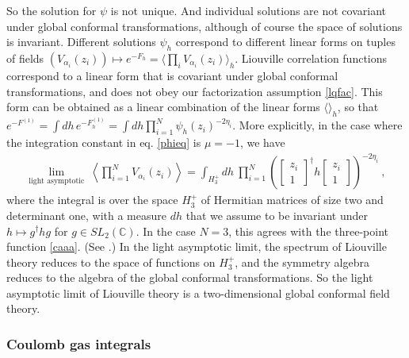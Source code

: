 \documentclass[12pt, a4paper, notitlepage, twoside]{report}
\numberwithin{equation}{section}
\theoremstyle{break}
\begin{document}
So the solution for $\psi$ is not unique. And individual solutions are not covariant under global conformal transformations, although of course the space of solutions is invariant.
Different solutions $\psi_h$ correspond to different linear forms on tuples of fields $(V_{\alpha_i}(z_i)) \mapsto e^{-F_h} = \langle \prod_i V_{\alpha_i}(z_i)\rangle_h$. 
Liouville correlation functions correspond to a linear form that is covariant under global conformal transformations, and does not  obey our factorization assumption \eqref{lqfac}. 
This form can be obtained as a linear combination of the linear forms $\langle \rangle_h$, so that $e^{-F^{(1)}} = \int dh\, e^{-F^{(1)}_h} = \int dh \prod_{i=1}^N \psi_h(z_i)^{-2\eta_i}$. 
More explicitly, in the case where the integration constant in eq. \eqref{phieq} is $\mu=-1$, we have
\begin{align}
\underset{\text{light asymptotic}}{\lim}\ \left\langle\prod_{i=1}^N V_{\alpha_i}(z_i)\right\rangle= \int_{H^+_3} dh\ \prod_{i=1}^N \left( \left[\begin{smallmatrix} z_i \\ 1 \end{smallmatrix}\right]^\dagger h \left[\begin{smallmatrix} z_i \\ 1 \end{smallmatrix}\right] \right)^{-2\eta_i}\ ,
\label{zih}
\end{align}
where the integral is over the space \textbf{\boldmath $H_3^+$} of Hermitian matrices of size two and determinant one, with a measure $dh$ that we assume to be invariant under $h\mapsto g^\dagger hg$ for $g\in SL_2({\mathbb{C}})$.
In the case $N=3$, this agrees with the three-point function \eqref{caaa}. (See \cite{zz95}.) In the light asymptotic limit, the spectrum of Liouville theory reduces to the space of functions on $H_3^+$, and the symmetry algebra reduces to the algebra of the global conformal transformations.
So
the light asymptotic limit of Liouville theory is a two-dimensional global conformal field theory.

\subsubsection{Coulomb gas integrals}
\end{document}
